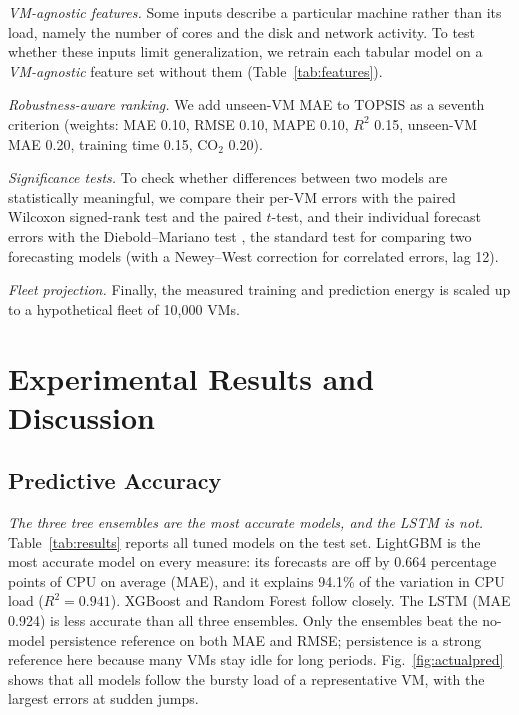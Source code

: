 \documentclass[conference,letterpaper,10pt]{IEEEtran}
\begin{document}
\textit{VM-agnostic features.} Some inputs describe a particular machine rather than its load, namely the number of cores and the disk and network activity. To test whether these inputs limit generalization, we retrain each tabular model on a \emph{VM-agnostic} feature set without them (Table~\ref{tab:features}).

\textit{Robustness-aware ranking.} We add unseen-VM MAE to TOPSIS as a seventh criterion (weights: MAE 0.10, RMSE 0.10, MAPE 0.10, $R^2$ 0.15, unseen-VM MAE 0.20, training time 0.15, CO$_2$ 0.20).

\textit{Significance tests.} To check whether differences between two models are statistically meaningful, we compare their per-VM errors with the paired Wilcoxon signed-rank test \cite{wilcoxon1945} and the paired $t$-test, and their individual forecast errors with the Diebold--Mariano test \cite{diebold1995dm}, the standard test for comparing two forecasting models (with a Newey--West correction for correlated errors, lag 12).

\textit{Fleet projection.} Finally, the measured training and prediction energy is scaled up to a hypothetical fleet of 10{,}000 VMs.

\section{Experimental Results and Discussion}
\label{sec:results}

\subsection{Predictive Accuracy}
\textit{The three tree ensembles are the most accurate models, and the LSTM is not.} Table~\ref{tab:results} reports all tuned models on the test set. LightGBM is the most accurate model on every measure: its forecasts are off by 0.664 percentage points of CPU on average (MAE), and it explains 94.1\% of the variation in CPU load ($R^2=0.941$). XGBoost and Random Forest follow closely. The LSTM (MAE 0.924) is less accurate than all three ensembles. Only the ensembles beat the no-model persistence reference on both MAE and RMSE; persistence is a strong reference here because many VMs stay idle for long periods. Fig.~\ref{fig:actualpred} shows that all models follow the bursty load of a representative VM, with the largest errors at sudden jumps.
\end{document}
